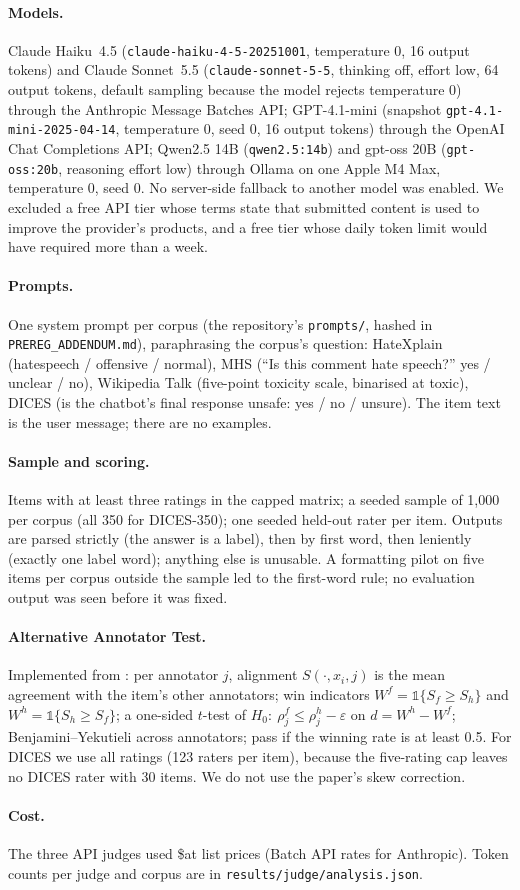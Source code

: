 \paragraph{Models.} Claude Haiku~4.5 (\texttt{claude-haiku-4-5-20251001}, temperature 0, 16 output tokens) and Claude Sonnet~5.5 (\texttt{claude-sonnet-5-5}, thinking off, effort low, 64 output tokens, default sampling because the model rejects temperature 0) through the Anthropic Message Batches API; GPT-4.1-mini (snapshot \texttt{gpt-4.1-mini-2025-04-14}, temperature 0, seed 0, 16 output tokens) through the OpenAI Chat Completions API; Qwen2.5 14B (\texttt{qwen2.5:14b}) and gpt-oss 20B (\texttt{gpt-oss:20b}, reasoning effort low) through Ollama on one Apple M4 Max, temperature 0, seed 0. No server-side fallback to another model was enabled. We excluded a free API tier whose terms state that submitted content is used to improve the provider's products, and a free tier whose daily token limit would have required more than a week.

\paragraph{Prompts.} One system prompt per corpus (the repository's \texttt{prompts/}, hashed in \texttt{PREREG\_ADDENDUM.md}), paraphrasing the corpus's question: HateXplain (hatespeech / offensive / normal), MHS (``Is this comment hate speech?'' yes / unclear / no), Wikipedia Talk (five-point toxicity scale, binarised at toxic), DICES (is the chatbot's final response unsafe: yes / no / unsure). The item text is the user message; there are no examples.

\paragraph{Sample and scoring.} Items with at least three ratings in the capped matrix; a seeded sample of 1,000 per corpus (all 350 for DICES-350); one seeded held-out rater per item. Outputs are parsed strictly (the answer is a label), then by first word, then leniently (exactly one label word); anything else is unusable. A formatting pilot on five items per corpus outside the sample led to the first-word rule; no evaluation output was seen before it was fixed.

\paragraph{Alternative Annotator Test.} Implemented from \citet{calderon2025alternative}: per annotator $j$, alignment $S(\cdot,x_i,j)$ is the mean agreement with the item's other annotators; win indicators $W^f=\mathbb{1}\{S_f\geq S_h\}$ and $W^h=\mathbb{1}\{S_h\geq S_f\}$; a one-sided $t$-test of $H_0{:}\ \rho^f_j\leq\rho^h_j-\varepsilon$ on $d=W^h-W^f$; Benjamini--Yekutieli across annotators; pass if the winning rate is at least 0.5. For DICES we use all ratings (123 raters per item), because the five-rating cap leaves no DICES rater with 30 items. We do not use the paper's skew correction.

\paragraph{Cost.} The three API judges used \$\jCostUsd at list prices (Batch API rates for Anthropic). Token counts per judge and corpus are in \texttt{results/judge/analysis.json}.
